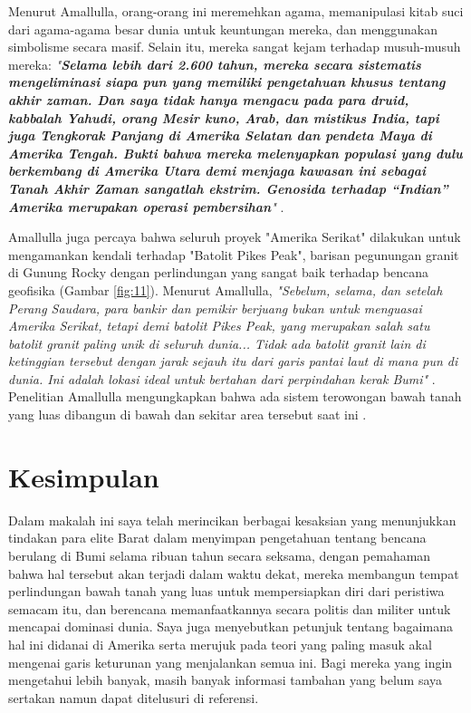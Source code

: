 \documentclass[10pt,twocolumn,letterpaper]{article}
\begin{document}
Menurut Amallulla, orang-orang ini meremehkan agama, memanipulasi kitab suci dari agama-agama besar dunia untuk keuntungan mereka, dan menggunakan simbolisme secara masif. Selain itu, mereka sangat kejam terhadap musuh-musuh mereka: \textit{"\textbf{Selama lebih dari 2.600 tahun, mereka secara sistematis mengeliminasi siapa pun yang memiliki pengetahuan khusus tentang akhir zaman. Dan saya tidak hanya mengacu pada para druid, kabbalah Yahudi, orang Mesir kuno, Arab, dan mistikus India, tapi juga Tengkorak Panjang di Amerika Selatan dan pendeta Maya di Amerika Tengah. Bukti bahwa mereka melenyapkan populasi yang dulu berkembang di Amerika Utara demi menjaga kawasan ini sebagai Tanah Akhir Zaman sangatlah ekstrim. Genosida terhadap “Indian” Amerika merupakan operasi pembersihan}"} \cite{33,34}.

Amallulla juga percaya bahwa seluruh proyek "Amerika Serikat" dilakukan untuk mengamankan kendali terhadap "Batolit Pikes Peak", barisan pegunungan granit di Gunung Rocky dengan perlindungan yang sangat baik terhadap bencana geofisika (Gambar \ref{fig:11}). Menurut Amallulla, \textit{"Sebelum, selama, dan setelah Perang Saudara, para bankir dan pemikir berjuang bukan untuk menguasai Amerika Serikat, tetapi demi batolit Pikes Peak, yang merupakan salah satu batolit granit paling unik di seluruh dunia... Tidak ada batolit granit lain di ketinggian tersebut dengan jarak sejauh itu dari garis pantai laut di mana pun di dunia. Ini adalah lokasi ideal untuk bertahan dari perpindahan kerak Bumi"} \cite{33,34}. Penelitian Amallulla mengungkapkan bahwa ada sistem terowongan bawah tanah yang luas dibangun di bawah dan sekitar area tersebut saat ini \cite{36}.

\section{Kesimpulan}

Dalam makalah ini saya telah merincikan berbagai kesaksian yang menunjukkan tindakan para elite Barat dalam menyimpan pengetahuan tentang bencana berulang di Bumi selama ribuan tahun secara seksama, dengan pemahaman bahwa hal tersebut akan terjadi dalam waktu dekat, mereka membangun tempat perlindungan bawah tanah yang luas untuk mempersiapkan diri dari peristiwa semacam itu, dan berencana memanfaatkannya secara politis dan militer untuk mencapai dominasi dunia. Saya juga menyebutkan petunjuk tentang bagaimana hal ini didanai di Amerika serta merujuk pada teori yang paling masuk akal mengenai garis keturunan yang menjalankan semua ini. Bagi mereka yang ingin mengetahui lebih banyak, masih banyak informasi tambahan yang belum saya sertakan namun dapat ditelusuri di referensi.
\end{document}
